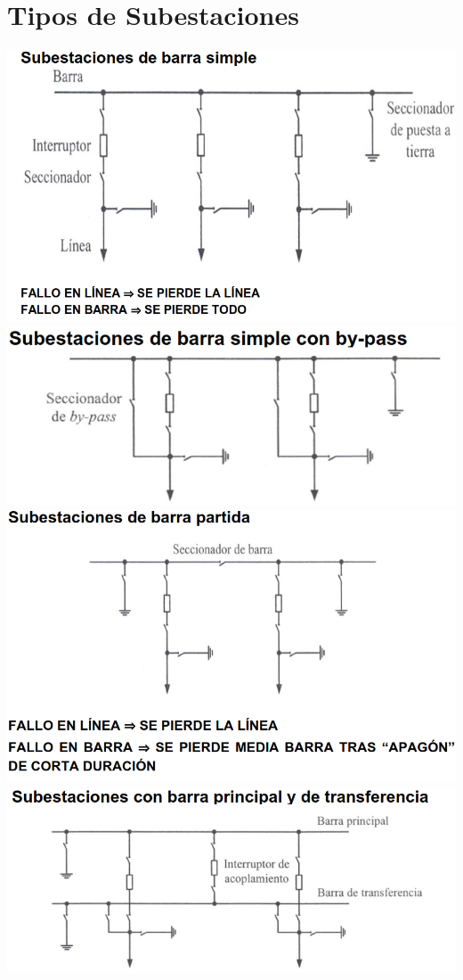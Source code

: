 \documentclass[10pt,a4paper]{article}
\begin{document}
\section{Tipos de Subestaciones}
\begin{center}
    \includegraphics[scale = 0.6]{3.png}
    \includegraphics[scale = 0.6]{4.png}
    \includegraphics[scale = 0.6]{5.png}
    \includegraphics[scale = 0.6]{6.png}

\end{center}
\end{document}
